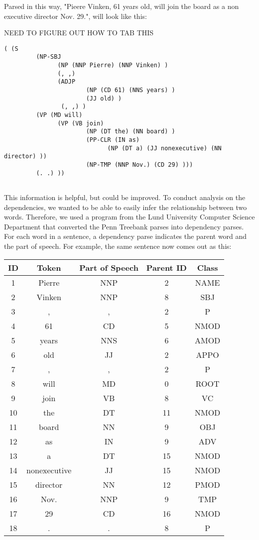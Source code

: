 \documentclass[12pt,fleqn]{article}
\begin{document}
Parsed in this way, "Pieere Vinken, 61 years old, will join the board as a non executive director Nov. 29.", will look like this: 

NEED TO FIGURE OUT HOW TO TAB THIS
\begin{verbatim}
( (S
         (NP-SBJ 
               (NP (NNP Pierre) (NNP Vinken) )
               (, ,) 
               (ADJP
                       (NP (CD 61) (NNS years) )
                       (JJ old) )
                (, ,) )
         (VP (MD will) 
               (VP (VB join) 
                       (NP (DT the) (NN board) )
                       (PP-CLR (IN as) 
                             (NP (DT a) (JJ nonexecutive) (NN director) ))
                       (NP-TMP (NNP Nov.) (CD 29) )))
         (. .) ))
	
\end{verbatim}

This information is helpful, but could be improved. To conduct analysis on the dependencies, we wanted to be able to easily infer the relationship between two words. Therefore, we used a program from the Lund University Computer Science Department that converted the Penn Treebank parses into dependency parses. For each word in a sentence, a dependency parse indicates the parent word and the part of speech. For example, the same sentence now comes out as this:
\\

        \begin{tabular}{||ccccc|}
            ID & Token & Part of Speech & Parent ID & Class \\ 
            \hline
            1 &Pierre & NNP & 2 & NAME \\
            2 & Vinken & NNP & 8 & SBJ\\
            3 & , & , & 2 & P\\
            4 & 61 & CD & 5 & NMOD\\
            5 & years & NNS & 6 & AMOD\\
            6 & old & JJ & 2 & APPO\\
            7 & , & , & 2 & P\\
            8 & will & MD & 0 & ROOT\\
            9 & join & VB & 8 & VC\\
            10 & the & DT & 11 & NMOD\\
            11 & board & NN & 9 & OBJ\\
            12 & as & IN & 9 & ADV\\
            13 & a & DT & 15 & NMOD\\
            14 & nonexecutive & JJ & 15 & NMOD\\
            15 & director & NN & 12 & PMOD\\
            16 & Nov. & NNP & 9 & TMP\\
            17 & 29 & CD & 16 & NMOD\\
            18 & . & . & 8 & P\\
            \hline
        \end{tabular} \\
\end{document}
